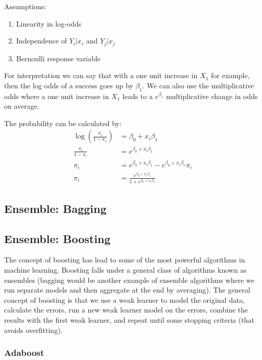 \documentclass[paper=a4, fontsize=11pt]{scrartcl} %
\numberwithin{equation}{section} %
\numberwithin{figure}{section} %
\numberwithin{table}{section} %
\begin{document}
Assumptions:
\begin{enumerate}
\item Linearity in log-odds
\item Independence of $Y_i|x_i$ and $Y_j|x_j$
\item Bernoulli response variable
\end{enumerate}

For interpretation we can say that with a one unit increase in $X_1$ for example, then the log odds of a success goes up by $\beta_1$. We can also use the multiplicative odds where a one unit increase in $X_1$ leads to a $e^{\beta_1}$ multiplicative change in odds on average.

The probability can be calculated by:
\begin{equation}
\begin{split}
\log \left(\frac{\pi_i}{1-\pi_1} \right) & = \beta_0 + x_i \beta_1 \\
\frac{\pi_i}{1-\pi_i} &= e^{\beta_0 + x_i \beta_1} \\
\pi_i &= e^{\beta_0 + x_i \beta_1} - e^{\beta_0 + x_i \beta_1} \pi_i \\
\pi_i &= \frac{e^{\beta_0 + x_i \beta_1}}{1+e^{\beta_0 + x_i \beta_1}}
\end{split}
\end{equation}

\subsection{Ensemble: Bagging}

\subsection{Ensemble: Boosting}

The concept of boosting has lead to some of the most powerful algorithms in machine learning. Boosting falls under a general class of algorithms known as ensembles (bagging would be another example of ensemble algorithms where we run separate models and then aggregate at the end by averaging). The general concept of boosting is that we use a weak learner to model the original data, calculate the errors, run a new weak learner model on the errors, combine the results with the first weak learner, and repeat until some stopping criteria (that avoids overfitting). 

\subsubsection{Adaboost}
\end{document}
